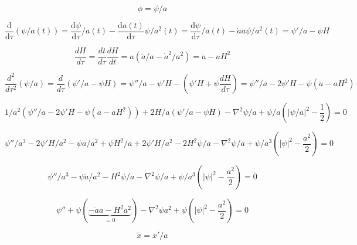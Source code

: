\documentclass[a4paper]{article}
\begin{document}
\begin{equation}
    \phi = \psi / a
\end{equation}

\begin{equation}
    \frac{\mathrm{d}}{\mathrm{d} \tau} ( \psi / a(t) ) = \frac{\mathrm{d} \psi}{\mathrm{d} \tau} / a(t) - \frac{\mathrm{d} a(t)}{\mathrm{d} \tau} \psi / a^2(t)
    = \frac{\mathrm{d} \psi}{\mathrm{d} \tau} / a(t) - \dot{a} a \psi / a^2(t)
    = \psi' / a - \psi H
\end{equation}

\begin{equation}
    \frac{d H}{d \tau} = \frac{d t}{d \tau} \frac{d H}{d t} = a (\ddot{a} / a - \dot{a}^2 / a^2) = \ddot{a} - a H^2
\end{equation}

\begin{equation}
    \frac{d^2}{d \tau^2} (\psi / a) = \frac{d}{d \tau} (\psi' / a - \psi H)
    = \psi'' / a - \psi' H - (\psi' H + \psi \frac{d H}{d \tau})
    = \psi'' / a - 2 \psi' H - \psi ( \ddot{a} - a H^2 )
\end{equation}

\begin{equation}
    1/a^2 ( \psi'' / a - 2 \psi' H - \psi ( \ddot{a} - a H^2 ) ) + 2 H / a (\psi' / a - \psi H)
    - \nabla^2 \psi / a + \psi / a \left( |\psi / a|^2 - \frac{1}{2} \right) = 0
\end{equation}

\begin{equation}
    \psi'' / a^3 - 2 \psi' H / a^2 - \psi \ddot{a} / a^2 + \psi H^2 / a
    + 2 \psi' H / a^2 - 2 H^2 \psi / a
    - \nabla^2 \psi / a + \psi / a^3 ( |\psi|^2 - \frac{a^2}{2} ) = 0
\end{equation}

\begin{equation}
    \psi'' / a^3 - \psi \ddot{a} / a^2 - H^2 \psi / a
    - \nabla^2 \psi / a + \psi / a^3 ( |\psi|^2 - \frac{a^2}{2} ) = 0
\end{equation}

\begin{equation}
    \psi'' + \psi (\underbrace{- \ddot{a} a - H^2 a^2}_{= 0})
    - \nabla^2 \psi a^2 + \psi ( |\psi|^2 - \frac{a^2}{2} ) = 0
\end{equation}

\begin{equation}
    \tilde{x} = x' / a
\end{equation}
\end{document}
